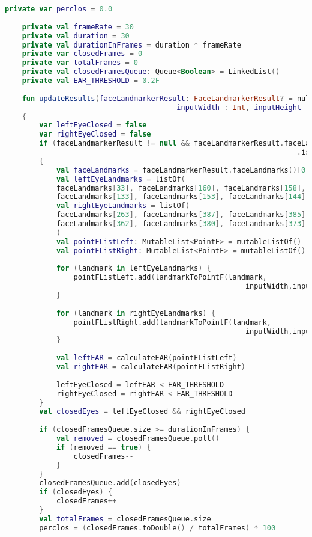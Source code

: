 \begin{lstlisting}[language=Kotlin, caption=PERCLOS en EAR berekenen, label={lst:updateResults}]
    private var perclos = 0.0
    
    private val frameRate = 30
    private val duration = 30
    private val durationInFrames = duration * frameRate
    private var closedFrames = 0
    private var totalFrames = 0
    private val closedFramesQueue: Queue<Boolean> = LinkedList()
    private val EAR_THRESHOLD = 0.2F
    
    fun updateResults(faceLandmarkerResult: FaceLandmarkerResult? = null,
                                        inputWidth : Int, inputHeight : Int)
    {
        var leftEyeClosed = false
        var rightEyeClosed = false
        if (faceLandmarkerResult != null && faceLandmarkerResult.faceLandmarks()
                                                                    .isNotEmpty())
        {
            val faceLandmarks = faceLandmarkerResult.faceLandmarks()[0]
            val leftEyeLandmarks = listOf(
            faceLandmarks[33], faceLandmarks[160], faceLandmarks[158],
            faceLandmarks[133], faceLandmarks[153], faceLandmarks[144])
            val rightEyeLandmarks = listOf(
            faceLandmarks[263], faceLandmarks[387], faceLandmarks[385],
            faceLandmarks[362], faceLandmarks[380], faceLandmarks[373]
            )
            val pointFListLeft: MutableList<PointF> = mutableListOf()
            val pointFListRight: MutableList<PointF> = mutableListOf()
            
            for (landmark in leftEyeLandmarks) {
                pointFListLeft.add(landmarkToPointF(landmark,
                                                        inputWidth,inputHeight))
            }
            
            for (landmark in rightEyeLandmarks) {
                pointFListRight.add(landmarkToPointF(landmark,
                                                        inputWidth,inputHeight))
            }
            
            val leftEAR = calculateEAR(pointFListLeft)
            val rightEAR = calculateEAR(pointFListRight)
            
            leftEyeClosed = leftEAR < EAR_THRESHOLD
            rightEyeClosed = rightEAR < EAR_THRESHOLD
        }
        val closedEyes = leftEyeClosed && rightEyeClosed
        
        if (closedFramesQueue.size >= durationInFrames) {
            val removed = closedFramesQueue.poll()
            if (removed == true) {
                closedFrames--
            }
        }
        closedFramesQueue.add(closedEyes)
        if (closedEyes) {
            closedFrames++
        }
        val totalFrames = closedFramesQueue.size
        perclos = (closedFrames.toDouble() / totalFrames) * 100
        

\end{lstlisting}
